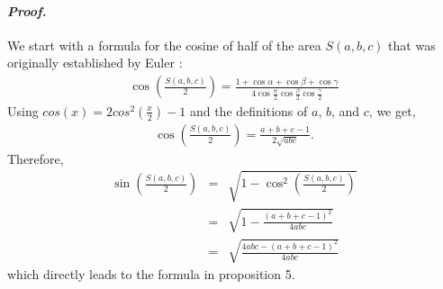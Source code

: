 \documentclass[11 pt]{article}
\theoremstyle{plain} \theorembodyfont{\rmfamily}
\begin{document}
  \paragraph{\emph{Proof.}} We start with a formula for the cosine of half of the area $S(a,b,c)$ that was originally established by Euler \cite{Euler1797, Papa14}:
    \begin{eqnarray}
  \cos \left(\frac{S(a,b,c)}{2} \right) =\frac{1+\cos \alpha + \cos \beta + \cos \gamma}{4 \cos \frac{\alpha}{2} \cos \frac{\beta}{2} \cos \frac{\gamma}{2}}
  \end{eqnarray}
 Using $cos(x)= 2cos^2(\frac{x}{2}) - 1$ and the definitions of $a$, $b$, and $c$, we get,
\begin{eqnarray}
  \cos \left(\frac{S(a,b,c)}{2} \right) =\frac{a+b+c-1}{2 \sqrt{abc}}.
  \end{eqnarray}
  Therefore,
 \begin{eqnarray}
  \sin \left(\frac{S(a,b,c)}{2} \right) &=& \sqrt{ 1 - \cos^2(\frac{S(a,b,c)}{2})} \nonumber \\
  &=&  \sqrt{ 1 - \frac{(a+b+c-1)^2}{4abc}} \nonumber \\
   &=&  \sqrt{ \frac{4abc-(a+b+c-1)^2}{4abc}} 
   \label{eqn:sin}
  \end{eqnarray}
 which directly leads to the formula in proposition 5.
 
\end{document}
